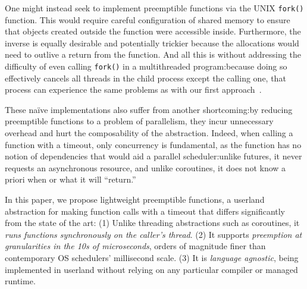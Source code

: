 One might instead seek to implement preemptible functions via the UNIX
\texttt{fork()} function.  This would require careful configuration of shared memory
to ensure that objects created outside the function were accessible inside.
Furthermore, the inverse is equally desirable and potentially trickier because the
allocations would need to outlive a return from the function.  And all this is
without addressing the difficulty of even calling \texttt{fork()} in a multithreaded
program:\@ because doing so effectively cancels all threads in the child process
except the calling one, that process can experience the same problems as with our
first approach~\cite{baumann:hotos2019}.

These na\"ive implementations also suffer from another shortcoming:\@ by reducing
preemptible functions to a problem of parallelism, they incur unnecessary overhead
and hurt the composability of the abstraction.  Indeed, when calling a function with
a timeout, only concurrency is fundamental, as the function has no notion of
dependencies that would aid a parallel scheduler:\@ unlike futures, it never requests
an asynchronous resource, and unlike coroutines, it does not know a priori when or
what it will ``return.''

In this paper, we propose lightweight preemptible functions, a userland abstraction
for making function calls with a timeout that differs significantly from the state of
the art:  (1) Unlike threading abstractions such as coroutines, it \textit{runs
functions synchronously on the caller's thread}.  (2) It supports \textit{preemption
at granularities in the 10s of microseconds}, orders of magnitude finer than
contemporary OS schedulers' millisecond scale.  (3) It is \textit{language agnostic},
being implemented in userland without relying on any particular compiler or managed
runtime.
